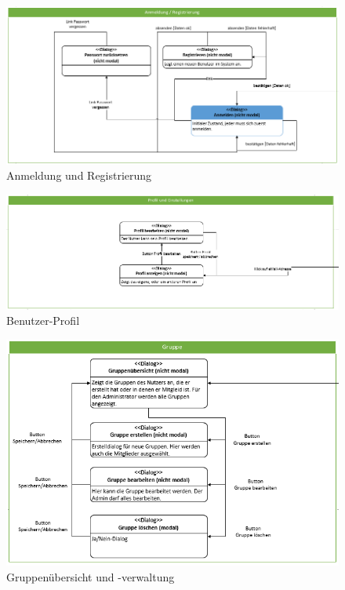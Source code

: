 \documentclass[12pt,a4paper]{article}
\begin{document}
{\begin{landscape}
\begin{figure}[H]
	\centering
	\includegraphics[width=25cm]{Bilder/Mockups/DSDAnmeldungRegistierung.png}
	\caption{Anmeldung und Registrierung}
	\label{DSDAnmeldungRegistierung}
\end{figure}

\begin{figure}[H]
	\centering
	\includegraphics[width=25cm]{Bilder/Mockups/DSDProfilUndEinstellungen.png}
	\caption{Benutzer-Profil}
	\label{DSDProfilUndEinstellungen}
\end{figure}

\begin{figure}[H]
	\centering
	\includegraphics[width=25cm]{Bilder/Mockups/DSDGruppen.png}
	\caption{Gruppenübersicht und -verwaltung}
	\label{DSDGruppen}
\end{figure}


\end{landscape}}
\end{document}
